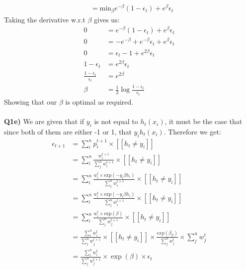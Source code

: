 \documentclass{article}
\begin{document}
\begin{titlepage}
\begin{align*}
&= \text{min}_{\beta}  e^{-\beta} (1-\epsilon_t) +  e^{\beta} \epsilon_t
\end{align*}
Taking the derivative w.r.t $\beta$ gives us:
\begin{align*}
0 &=  e^{-\beta} (1-\epsilon_t) +  e^{\beta} \epsilon_t \\
0 &=  -e^{-\beta} + e^{-\beta}\epsilon_t +  e^{\beta} \epsilon_t \\
0 &= \epsilon_t - 1 + e^{2\beta} \epsilon_t \\
1 - \epsilon_t &= e^{2\beta} \epsilon_t \\
\frac{1 - \epsilon_t}{\epsilon_t} &= e^{2\beta} \\
\beta &= \frac{1}{2} \log \frac{1-\epsilon_t}{\epsilon_t}
\end{align*}
Showing that our $\beta$ is optimal as required. \\\\
\textbf{Q1e)} We are given that if $y_i$ is not equal to $h_t(x_i)$, it must be the case that since both of them are either -1 or 1, that $y_ih_t(x_i)$. Therefore we get:
\begin{align*}
\epsilon_{t+1} &= \sum_i^n p_i^{t+1} \times [[h_t \neq y_i]] \\
&=  \sum_i^n \frac{w_i^{t+1}}{\sum_j^n w_i^{t+1}} \times [[h_t \neq y_i]] \\
&= \sum_i^n \frac{w_i^{t}\times \text{exp}(-y_i\beta h_i)}{\sum_j^n w_i^{t+1}} \times [[h_t \neq y_i]] \\
&= \sum_i^n \frac{w_i^{t}\times \text{exp}(-y_i\beta h_i)}{\sum_j^n w_i^{t+1}} \times [[h_t \neq y_i]] \\
&= \sum_i^n \frac{w_i^{t}\times \text{exp}(\beta)}{\sum_j^n w_j^{t+1}} \times [[h_t \neq y_i]] \\
&= \frac{\sum_i^n  w_i^{t}}{\sum_j^n w_j^{t+1}} \times [[h_t \neq y_i]] \times \frac{exp(\beta_T)}{\sum_j^n w_j^{t}} \times \sum_j^n w_j^{t} \\ 
&= \frac{\sum_i^n  w_i^{t}}{\sum_j^n w_j^{t+1}} \times \exp(\beta) \times \epsilon_t
\end{align*}
\end{titlepage}
\end{document}

